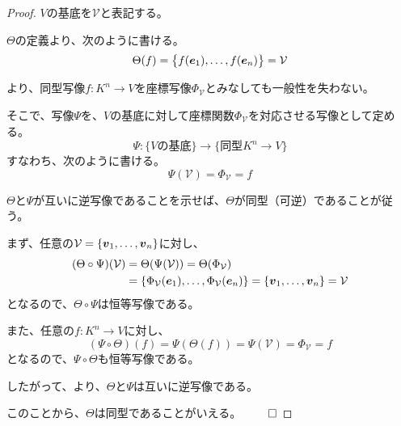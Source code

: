 \documentclass[../../../topic_linear-algebra]{subfiles}
\begin{document}
\begin{proof}
  $V$の基底を$\mathcal{V}$と表記する。
  
  $\Theta$の定義より、次のように書ける。
  \begin{equation*}
    \Theta(f) = \bigl\{f(\vb*{e}_1), \ldots, f(\vb*{e}_n)\bigr\} = \mathcal{V}
  \end{equation*}
  
  \br

  より、同型写像$f\colon K^n \to V$を座標写像$\Phi_{\mathcal{V}}$とみなしても一般性を失わない。

  \br
  
  そこで、写像$\Psi$を、$V$の基底に対して座標関数$\Phi_{\mathcal{V}}$を対応させる写像として定める。
  \begin{equation*}
    \Psi\colon \bigl\{ V\text{の基底} \bigr\} \rightarrow \bigl\{ \text{同型} K^n \to V \bigr\}
  \end{equation*}
  すなわち、次のように書ける。
  \begin{equation*}
    \Psi(\mathcal{V}) = \Phi_{\mathcal{V}} = f
  \end{equation*}
  
  \br

  $\Theta$と$\Psi$が互いに逆写像であることを示せば、$\Theta$が同型（可逆）であることが従う。
  
  \br
  
  まず、任意の$\mathcal{V} = \{ \vb*{v}_1, \ldots, \vb*{v}_n \}$に対し、
  \begin{align*}
    (\Theta \circ \Psi)(\mathcal{V}) &= \Theta(\Psi(\mathcal{V})) = \Theta(\Phi_{\mathcal{V}}) \\
    &= \{ \Phi_{\mathcal{V}}(\vb*{e}_1), \ldots, \Phi_{\mathcal{V}}(\vb*{e}_n) \} = \{ \vb*{v}_1, \ldots, \vb*{v}_n \} = \mathcal{V}
  \end{align*}
  となるので、$\Theta \circ \Psi$は恒等写像である。
  
  \br

  また、任意の$f \colon K^n \to V$に対し、
  \begin{equation*}
    (\Psi \circ \Theta)(f) = \Psi(\Theta(f))
    = \Psi(\mathcal{V}) = \Phi_{\mathcal{V}} = f
  \end{equation*}
  となるので、$\Psi \circ \Theta$も恒等写像である。
  
  \br
  
  したがって、より、$\Theta$と$\Psi$は互いに逆写像である。
  
  このことから、$\Theta$は同型であることがいえる。 $\qed$
\end{proof}
\end{document}

